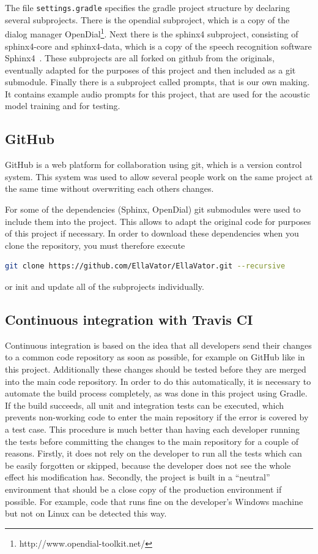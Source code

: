 \documentclass[a4paper, 12pt]{article}
\begin{document}
The file \texttt{settings.gradle} specifies the gradle project structure by declaring several subprojects.
There is the opendial subproject, which is a copy of the dialog manager OpenDial\footnote{http://www.opendial-toolkit.net/}.
Next there is the sphinx4 subproject, consisting of sphinx4-core and sphinx4-data, which is a copy of the speech recognition software Sphinx4~\cite{Walker:2004:SFO:1698193}.
These subprojects are all forked on github from the originals, eventually adapted for the purposes of this project and then included as a git submodule.
Finally there is a subproject called prompts, that is our own making.
It contains example audio prompts for this project, that are used for the acoustic model training and for testing.

\subsection{GitHub}
GitHub is a web platform for collaboration using git, which is a version control system.
This system was used to allow several people work on the same project at the same time without overwriting each others changes.

For some of the dependencies (Sphinx, OpenDial) git submodules were used to include them into the project.
This allows to adapt the original code for purposes of this project if necessary.
In order to download these dependencies when you clone the repository, you must therefore execute
\begin{lstlisting}[language=bash]
git clone https://github.com/EllaVator/EllaVator.git --recursive
\end{lstlisting}
or init and update all of the subprojects individually.
\subsection{Continuous integration with Travis CI}

Continuous integration is based on the idea that all developers send their changes to a common code repository as soon as possible, for example on GitHub like in this project.
Additionally these changes should be tested before they are merged into the main code repository.
In order to do this automatically, it is necessary to automate the build process completely, as was done in this project  using Gradle.
If the build succeeds, all unit and integration tests can be executed, which prevents non-working code to enter the main repository if the error is covered by a test case.
This procedure is much better than having each developer running the tests before committing the changes to the main repository for a couple of reasons.
Firstly, it does not rely on the developer to run all the tests which can be easily forgotten or skipped, because the developer does not see the whole effect his modification has.
Secondly, the project is built in a “neutral” environment that should be a close copy of the production environment if possible.
For example, code that runs fine on the developer's Windows machine but not on Linux can be detected this way.
\end{document}
